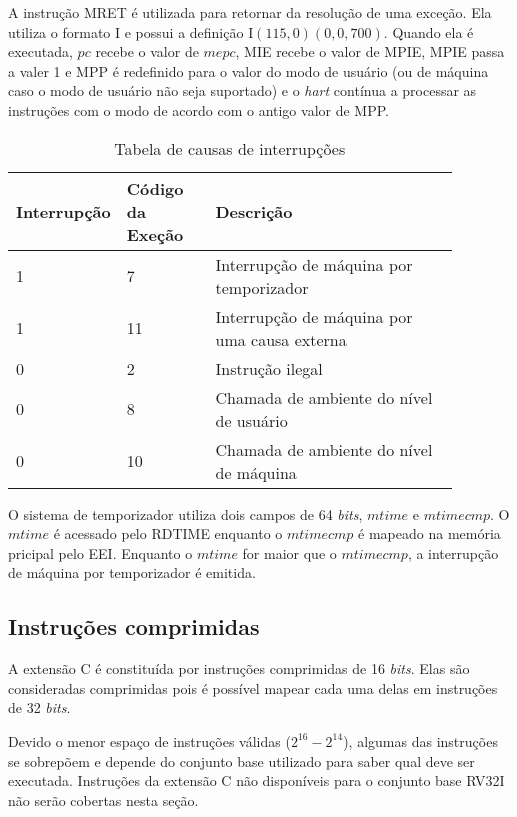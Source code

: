   A instrução MRET é utilizada para retornar da resolução de uma exceção. Ela utiliza o formato I e possui a definição
  I$(115, 0)(0, 0, 700)$. Quando ela é executada, $pc$ recebe o valor de $mepc$, MIE recebe o valor de MPIE, MPIE 
  passa a valer 1 e MPP é redefinido para o valor do modo de usuário (ou de máquina caso o modo de usuário não seja 
  suportado) e o \emph{hart} contínua a processar as instruções com o modo de acordo com o antigo valor de MPP.

  \begin{table}
    \begin{tabular}{ |p{0.13\linewidth}||p{0.2\linewidth}|p{0.55\linewidth}| } 
      \hline
      Interrupção & Código da Exeção & Descrição \\ \hline \hline

1 & 7 & Interrupção de máquina por temporizador \\ \hline
1 & 11 & Interrupção de máquina por uma causa externa \\ \hline
0 & 2 & Instrução ilegal \\ \hline
0 & 8 & Chamada de ambiente do nível de usuário \\ \hline
0 & 10 &  Chamada de ambiente do nível de máquina \\ \hline

    \end{tabular}
  \caption{Tabela de causas de interrupções \label{tab:icause}}
  \end{table}

  O sistema de temporizador utiliza dois campos de 64 \emph{bits}, $mtime$ e $mtimecmp$.
  O $mtime$ é acessado pelo RDTIME enquanto o $mtimecmp$ é mapeado na memória pricipal pelo EEI.
  Enquanto o $mtime$ for maior que o $mtimecmp$, a interrupção de máquina por temporizador é
  emitida.

\subsection{Instruções comprimidas}
\label{sec:C}

  A extensão C é constituída por instruções comprimidas de 16 \emph{bits}. Elas são consideradas comprimidas
  pois é possível mapear cada uma delas em instruções de 32 \emph{bits}.
  
  Devido o menor espaço de instruções válidas ($2^{16} - 2^{14}$), algumas das instruções se 
  sobrepõem e depende do conjunto base utilizado para saber qual deve ser executada. Instruções 
  da extensão C não disponíveis para o conjunto base RV32I não serão cobertas nesta seção.


